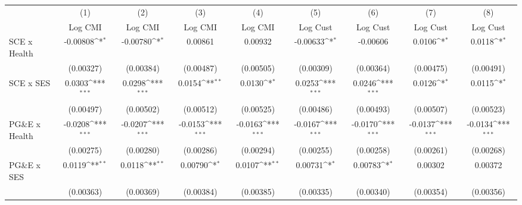 {
\def\sym#1{\ifmmode^{#1}\else\(^{#1}\)\fi}
\begin{tabular}{l*{8}{c}}
\hline\hline
                    &\multicolumn{1}{c}{(1)}&\multicolumn{1}{c}{(2)}&\multicolumn{1}{c}{(3)}&\multicolumn{1}{c}{(4)}&\multicolumn{1}{c}{(5)}&\multicolumn{1}{c}{(6)}&\multicolumn{1}{c}{(7)}&\multicolumn{1}{c}{(8)}\\
                    &\multicolumn{1}{c}{Log CMI}&\multicolumn{1}{c}{Log CMI}&\multicolumn{1}{c}{Log CMI}&\multicolumn{1}{c}{Log CMI}&\multicolumn{1}{c}{Log Cust}&\multicolumn{1}{c}{Log Cust}&\multicolumn{1}{c}{Log Cust}&\multicolumn{1}{c}{Log Cust}\\
\hline
SCE x Health        &    -0.00808\sym{*}  &    -0.00780\sym{*}  &     0.00861         &     0.00932         &    -0.00633\sym{*}  &    -0.00606         &      0.0106\sym{*}  &      0.0118\sym{*}  \\
                    &   (0.00327)         &   (0.00384)         &   (0.00487)         &   (0.00505)         &   (0.00309)         &   (0.00364)         &   (0.00475)         &   (0.00491)         \\
[1em]
SCE x SES           &      0.0303\sym{***}&      0.0298\sym{***}&      0.0154\sym{**} &      0.0130\sym{*}  &      0.0253\sym{***}&      0.0246\sym{***}&      0.0126\sym{*}  &      0.0115\sym{*}  \\
                    &   (0.00497)         &   (0.00502)         &   (0.00512)         &   (0.00525)         &   (0.00486)         &   (0.00493)         &   (0.00507)         &   (0.00523)         \\
[1em]
PG\&E x Health      &     -0.0208\sym{***}&     -0.0207\sym{***}&     -0.0153\sym{***}&     -0.0163\sym{***}&     -0.0167\sym{***}&     -0.0170\sym{***}&     -0.0137\sym{***}&     -0.0134\sym{***}\\
                    &   (0.00275)         &   (0.00280)         &   (0.00286)         &   (0.00294)         &   (0.00255)         &   (0.00258)         &   (0.00261)         &   (0.00268)         \\
[1em]
PG\&E x SES         &      0.0119\sym{**} &      0.0118\sym{**} &     0.00790\sym{*}  &      0.0107\sym{**} &     0.00731\sym{*}  &     0.00783\sym{*}  &     0.00302         &     0.00372         \\
                    &   (0.00363)         &   (0.00369)         &   (0.00384)         &   (0.00385)         &   (0.00335)         &   (0.00340)         &   (0.00354)         &   (0.00356)         \\

\end{tabular}}
